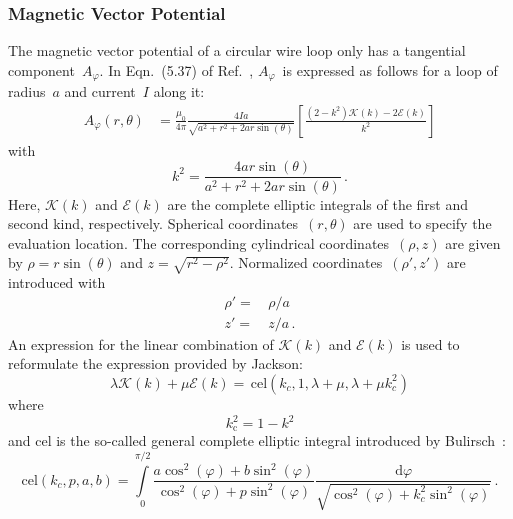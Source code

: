\subsubsection{Magnetic Vector Potential}
The magnetic vector potential of a circular wire loop
only has a tangential component~$A_\varphi$.
In Eqn.~(5.37) of Ref.~\cite{jackson}, $A_\varphi$~is expressed as
follows for a loop of radius~$a$ and current~$I$ along it:
\begin{align}
  A_\varphi(r, \theta) &= \frac{\mu_0}{4 \pi}
                          \frac{4 I a}{\sqrt{a^2 + r^2 + 2 a r \sin(\theta)}}
                          \left[
                            \frac{(2 - k^2)\mathcal{K}(k) - 2 \mathcal{E}(k)}{k^2}
                          \right] \label{eqn:cwl_A_phi_Jackson}
\end{align}
with
\begin{equation}
  k^2 = \frac{4 a r \sin(\theta)}{a^2 + r^2 + 2 a r \sin(\theta)} \, .
\end{equation}
Here, $\mathcal{K}(k)$ and $\mathcal{E}(k)$ are the complete elliptic integrals of the first and second kind, respectively.
Spherical coordinates~$(r, \theta)$ are used to specify the evaluation location.
The corresponding cylindrical coordinates~$(\rho, z)$ are given by
$\rho = r \sin(\theta)$ and $z = \sqrt{r^2 - \rho^2}$.
Normalized coordinates~$(\rho', z')$ are introduced with
\begin{align}
  \rho' =&\, \rho / a \label{eqn:rhoP} \\
    z'  =&\,   z  / a \label{eqn:zP}   \, .
\end{align}
An expression for the linear combination of $\mathcal{K}(k)$ and $\mathcal{E}(k)$
is used to reformulate the expression provided by Jackson:
\begin{equation}
  \lambda \mathcal{K}(k) + \mu \mathcal{E}(k) = \,\mathrm{cel}(k_c, 1, \lambda + \mu, \lambda + \mu k_c^2) \label{eqn:K_E_by_cel}
\end{equation}
where
\begin{equation}
  k_\mathrm{c}^2 = 1 - k^2
\end{equation}
and cel is the so-called general complete elliptic integral
introduced by Bulirsch~\cite{bulirsch_3}:
\begin{equation}
  \mathrm{cel}(k_c, p, a, b) =
  \int\limits_0^{\pi/2}
    \frac{a \cos^2(\varphi) + b \sin^2(\varphi)}
         {\cos^2(\varphi) + p \sin^2(\varphi)}
    \frac{\mathrm{d}\varphi}
         {\sqrt{\cos^2(\varphi) + k_c^2 \sin^2(\varphi)}} \, .
\end{equation}
